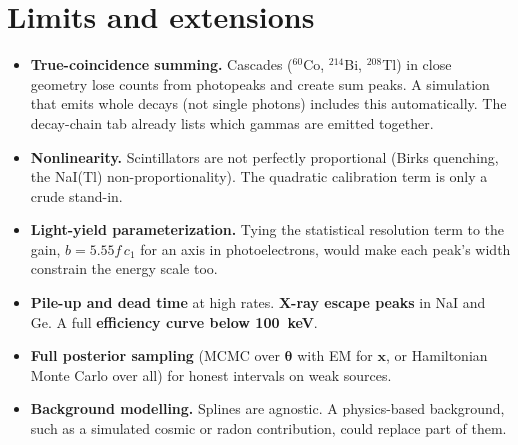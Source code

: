 \documentclass[11pt]{article}
\newcommand{\vth}{\bm{\theta}}
\newcommand{\vx}{\bm{x}}
\newcommand{\nuc}[2]{${}^{#1}$#2}
\begin{document}
\section{Limits and extensions}\label{sec:limits}
\begin{itemize}
\item \textbf{True-coincidence summing.} Cascades (\nuc{60}{Co}, \nuc{214}{Bi}, \nuc{208}{Tl}) in close geometry lose counts from photopeaks and create sum peaks. A simulation that emits whole decays (not single photons) includes this automatically. The decay-chain tab already lists which gammas are emitted together.
\item \textbf{Nonlinearity.} Scintillators are not perfectly proportional (Birks quenching, the NaI(Tl) non-proportionality). The quadratic calibration term is only a crude stand-in.
\item \textbf{Light-yield parameterization.} Tying the statistical resolution term to the gain, $b = 5.55f\,c_1$ for an axis in photoelectrons, would make each peak's width constrain the energy scale too.
\item \textbf{Pile-up and dead time} at high rates. \textbf{X-ray escape peaks} in NaI and Ge. A full \textbf{efficiency curve below \SI{100}{keV}}.
\item \textbf{Full posterior sampling} (MCMC over $\vth$ with EM for $\vx$, or Hamiltonian Monte Carlo over all) for honest intervals on weak sources.
\item \textbf{Background modelling.} Splines are agnostic. A physics-based background, such as a simulated cosmic or radon contribution, could replace part of them.
\end{itemize}

\end{document}
